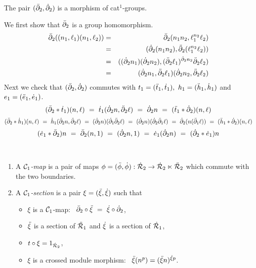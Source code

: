 \begin{lem}
The pair $(\bar{\partial}_2,\dot{\partial}_2)$ is a morphism of cat$^1$-groups.
\end{lem}
\begin{pf}
We first show that $\bar{\partial}_2$ is a group homomorphism.
\begin{eqnarray*}
\bar{\partial}_2 ((n_1, \ell_1)(n_1,\ell_2))  
   & = & \bar{\partial}_2(n_1n_2, \ell_1^{n_2} \ell_2) \\  
   & = & (\dot{\partial}_2(n_1 n_2), \ddot{\partial}_2(\ell_1^{n_2} \ell_2)) \\
   & = & ((\dot{\partial}_2 n_1)(\dot{\partial}_2 n_2), 
          (\ddot{\partial}_2 \ell_1)^{\dot{\partial}_2 n_2} \ddot{\partial}_2 \ell_2) \\
   & = & (\dot{\partial}_2 n_1, \ddot{\partial}_2 \ell_1)(\dot{\partial}_2 n_2, \ddot{\partial}_2 \ell_2) 
\end{eqnarray*}
Next we check that $(\bar{\partial}_2,\dot{\partial}_2)$ commutes with 
$t_1 = (\ddot{t}_1,\dot{t}_1),~ h_1 = (\ddot{h}_1,\dot{h}_1)$  and  $e_1 = (\ddot{e}_1,\dot{e}_1)$.
$$
(\bar{\partial}_2 * \dot{t}_1)(n,\ell)
 ~=~ \dot{t}_1(\dot{\partial}_2 n, \ddot{\partial}_2\ell)
 ~=~ \dot{\partial}_2 n
 ~=~ (\ddot{t}_1 * \dot{\partial}_2)(n,\ell)
$$
$$
(\bar{\partial}_2 * \dot{h}_1)(n,\ell)
 ~=~ \dot{h}_1(\dot{\partial}_2 n, \ddot{\partial}_2\ell)
 ~=~ (\dot{\partial}_2 n)(\dot{\partial}_1\ddot{\partial}_2\ell)
 ~=~ (\dot{\partial}_2 n)(\dot{\partial}_2\ddot{\partial}_1\ell)
 ~=~ \dot{\partial}_2(n(\ddot{\partial}_1\ell))
 ~=~ (\ddot{h}_1 * \dot{\partial}_2)(n,\ell)
$$
$$
(\dot{e}_1 * \bar{\partial}_2)n
 ~=~ \bar{\partial}_2(n,1)
 ~=~ (\dot{\partial}_2 n, 1)
 ~=~ \dot{e}_1(\dot{\partial}_2 n)
 ~=~ (\dot{\partial}_2 * \dot{e}_1) n
$$
\end{pf}

\vspace*{-8mm}
\begin{defn} \mbox{}\\
\begin{enumerate}[{\rm (a)}]
\item
\vspace*{-6mm}
A \emph{$\mathcal{C}_1$-map} is a pair of maps 
$\phi = (\ddot{\phi},\dot{\phi}) : \dot{\mathcal{R}}_2 \to \dot{\mathcal{R}}_2 \ltimes \ddot{\mathcal{R}}_2$ 
which commute with the two boundaries.
\item
A \emph{$\mathcal{C}_1$-section} is a pair  $\xi = (\ddot{\xi},\dot{\xi})$  such that
\begin{itemize}
\item
$\xi$ is a $\mathcal{C}_1$-map:~
$\bar{\partial}_2 \circ \ddot{\xi} ~=~ \dot{\xi} \circ \dot{\partial}_2$, 
\item
$\ddot{\xi}$ is a section of $\ddot{\mathcal{R}}_1$ and $\dot{\xi}$ is a section of $\dot{\mathcal{R}}_1$,
\item
$t \circ \xi = 1_{\dot{\mathcal{R}}_2}$,
\item
$\xi$ is a crossed module morphism:~ $\ddot{\xi}(n^p) = (\ddot{\xi} n)^{\dot{\xi} p}$.
\end{itemize}
\end{enumerate}
\end{defn}

